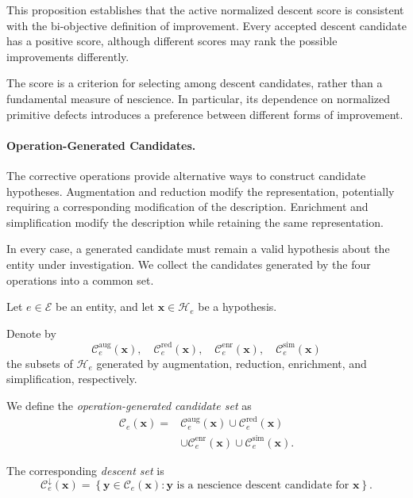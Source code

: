 This proposition establishes that the active normalized
descent score is consistent with the bi-objective
definition of improvement. Every accepted descent
candidate has a positive score, although different
scores may rank the possible improvements differently.

The score is a criterion for selecting among descent
candidates, rather than a fundamental measure of
nescience. In particular, its dependence on normalized
primitive defects introduces a preference between
different forms of improvement.

\paragraph{Operation-Generated Candidates.}

The corrective operations provide alternative ways
to construct candidate hypotheses. Augmentation and
reduction modify the representation, potentially
requiring a corresponding modification of the
description. Enrichment and simplification modify
the description while retaining the same representation.

In every case, a generated candidate must remain a
valid hypothesis about the entity under investigation.
We collect the candidates generated by the four
operations into a common set.

\begin{definition}
Let $e\in\mathcal E$ be an entity, and let
$\mathbf{x}\in\mathcal H_e$ be a hypothesis.

Denote by
\[
\mathcal C_e^{\mathrm{aug}}(\mathbf{x}),
\quad
\mathcal C_e^{\mathrm{red}}(\mathbf{x}),
\quad
\mathcal C_e^{\mathrm{enr}}(\mathbf{x}),
\quad
\mathcal C_e^{\mathrm{sim}}(\mathbf{x})
\]
the subsets of $\mathcal H_e$ generated by
augmentation, reduction, enrichment, and
simplification, respectively.

We define the \emph{operation-generated candidate set}
 as
\[
\begin{aligned}
\mathcal C_e(\mathbf{x})
={}&
\mathcal C_e^{\mathrm{aug}}(\mathbf{x})
\cup
\mathcal C_e^{\mathrm{red}}(\mathbf{x})\\
&\cup
\mathcal C_e^{\mathrm{enr}}(\mathbf{x})
\cup
\mathcal C_e^{\mathrm{sim}}(\mathbf{x}).
\end{aligned}
\]

The corresponding \emph{descent set}
 is
\[
\mathcal C_e^\downarrow(\mathbf{x})
=
\left\{
\mathbf{y}\in\mathcal C_e(\mathbf{x}):
\mathbf{y}\text{ is a nescience descent candidate
for }\mathbf{x}
\right\}.
\]
\end{definition}

